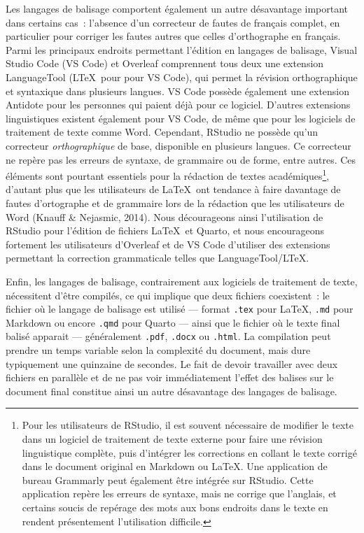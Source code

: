 \documentclass[
  letterpaper,
  DIV=11,
  numbers=noendperiod]{scrreprt}
\begin{document}
Les langages de balisage comportent également un autre désavantage
important dans certains cas~: l'absence d'un correcteur de fautes de
français complet, en particulier pour corriger les fautes autres que
celles d'orthographe en français. Parmi les principaux endroits
permettant l'édition en langages de balisage, Visual Studio Code (VS
Code) et Overleaf comprennent tous deux une extension LanguageTool
(L\TeX~pour pour VS Code), qui permet la révision orthographique et
syntaxique dans plusieurs langues. VS Code possède également une
extension Antidote pour les personnes qui paient déjà pour ce logiciel.
D'autres extensions linguistiques existent également pour VS Code, de
même que pour les logiciels de traitement de texte comme Word.
Cependant, RStudio ne possède qu'un correcteur \emph{orthographique} de
base, disponible en plusieurs langues. Ce correcteur ne repère pas les
erreurs de syntaxe, de grammaire ou de forme, entre autres. Ces éléments
sont pourtant essentiels pour la rédaction de textes
académiques\footnote{Pour les utilisateurs de RStudio, il est souvent
  nécessaire de modifier le texte dans un logiciel de traitement de
  texte externe pour faire une révision linguistique complète, puis
  d'intégrer les corrections en collant le texte corrigé dans le
  document original en Markdown ou \LaTeX. Une application de bureau
  Grammarly peut également être intégrée sur RStudio. Cette application
  repère les erreurs de syntaxe, mais ne corrige que l'anglais, et
  certains soucis de repérage des mots aux bons endroits dans le texte
  en rendent présentement l'utilisation difficile.}, d'autant plus que
les utilisateurs de \LaTeX~ont tendance à faire davantage de fautes
d'ortographe et de grammaire lors de la rédaction que les utilisateurs
de Word (Knauff \& Nejasmic, 2014). Nous décourageons ainsi
l'utilisation de RStudio pour l'édition de fichiers \LaTeX~et Quarto, et
nous encourageons fortement les utilisateurs d'Overleaf et de VS Code
d'utiliser des extensions permettant la correction grammaticale telles
que LanguageTool/L\TeX.

Enfin, les langages de balisage, contrairement aux logiciels de
traitement de texte, nécessitent d'être compilés, ce qui implique que
deux fichiers coexistent~: le fichier où le langage de balisage est
utilisé --- format \texttt{.tex} pour \LaTeX, \texttt{.md} pour Markdown
ou encore \texttt{.qmd} pour Quarto --- ainsi que le fichier où le texte
final balisé apparait --- généralement \texttt{.pdf}, \texttt{.docx} ou
\texttt{.html}. La compilation peut prendre un temps variable selon la
complexité du document, mais dure typiquement une quinzaine de secondes.
Le fait de devoir travailler avec deux fichiers en parallèle et de ne
pas voir immédiatement l'effet des balises sur le document final
constitue ainsi un autre désavantage des langages de balisage.
\end{document}
